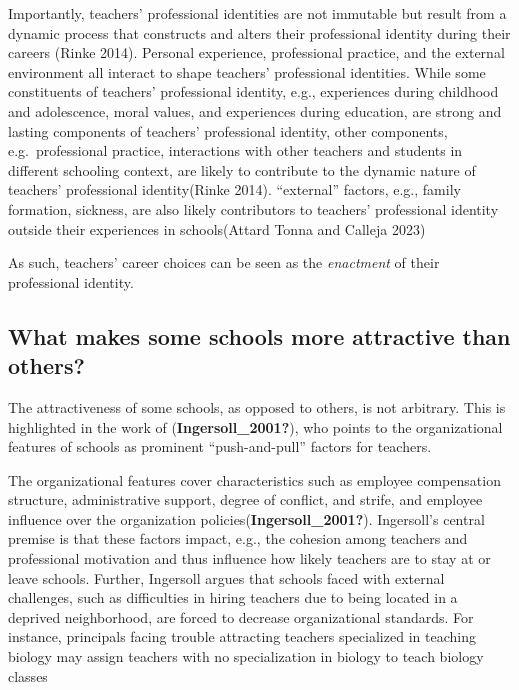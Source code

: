 \documentclass[
]{article}
\begin{document}
Importantly, teachers' professional identities are not immutable but result from a dynamic process that constructs and alters their professional identity during their careers (Rinke 2014). Personal experience, professional practice, and the external environment all interact to shape teachers' professional identities. While some constituents of teachers' professional identity, e.g., experiences during childhood and adolescence, moral values, and experiences during education, are strong and lasting components of teachers' professional identity, other components, e.g.~professional practice, interactions with other teachers and students in different schooling context, are likely to contribute to the dynamic nature of teachers' professional identity(Rinke 2014). ``external'' factors, e.g., family formation, sickness, are also likely contributors to teachers' professional identity outside their experiences in schools(Attard Tonna and Calleja 2023)

As such, teachers' career choices can be seen as the \emph{enactment} of their professional identity.

\hypertarget{what-makes-some-schools-more-attractive-than-others}{%
\subsection{What makes some schools more attractive than others?}\label{what-makes-some-schools-more-attractive-than-others}}

The attractiveness of some schools, as opposed to others, is not arbitrary. This is highlighted in the work of (\textbf{Ingersoll\_2001?}), who points to the organizational features of schools as prominent ``push-and-pull'' factors for teachers.

The organizational features cover characteristics such as employee
compensation structure, administrative support, degree of conflict, and
strife, and employee influence over the organization
policies(\textbf{Ingersoll\_2001?}). Ingersoll's central premise is that these
factors impact, e.g., the cohesion among teachers and professional
motivation and thus influence how likely teachers are to stay at or
leave schools. Further, Ingersoll argues that schools faced with
external challenges, such as difficulties in hiring teachers due to being
located in a deprived neighborhood, are forced to decrease
organizational standards. For instance, principals facing trouble
attracting teachers specialized in teaching biology may assign teachers
with no specialization in biology to teach biology classes
\end{document}
